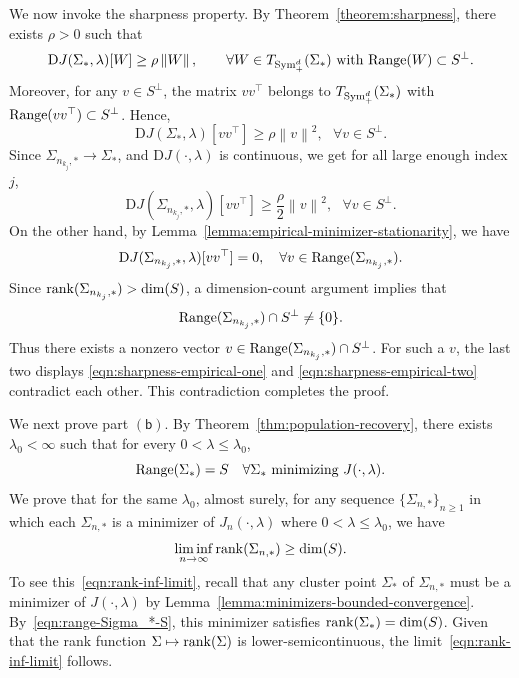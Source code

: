\documentclass[sn-mathphys-num]{sn-jnl}%
\numberwithin{equation}{section}
\newcommand{\norm}[1]{\left\|{#1}\right\|} %
\newcommand{\Range}{{\rm Range}}
\newcommand{\rank}{{\rm rank}}
\newcommand{\Sym}{{\rm \mathrm{Sym}}}
\theoremstyle{thmstyleone}%
\theoremstyle{thmstyletwo}%
\theoremstyle{thmstylethree}%
\begin{document}
We now invoke the sharpness property. By Theorem~\ref{theorem:sharpness}, 
there exists $\rho > 0$ such that
\begin{equation*}
	\mathrm{D} J(\Sigma_*, \lambda)[W] \ge \rho \norm{W}, \qquad \forall W \in T_{\Sym_+^d}(\Sigma_*)~\text{with}~ \Range(W) \subset S^\perp.
\end{equation*}
Moreover, for any $v \in S^\perp$, the matrix $vv^\top$ belongs to
$T_{\Sym_+^d}(\Sigma_*)$ with $\Range(vv^\top) \subset S^\perp$. Hence,
\begin{equation*}
	\mathrm{D} J(\Sigma_*, \lambda)[vv^\top] \ge \rho \norm{v}^2,~~~\forall v\in S^\perp.
\end{equation*} 
Since $\Sigma_{n_{k_j}, *} \to \Sigma_*$, and $\mathrm{D} J(\cdot, \lambda)$ is continuous, we get for all large enough index $j$, 
\begin{equation}
\label{eqn:sharpness-empirical-one}
	\mathrm{D} J(\Sigma_{n_{k_j}, *}, \lambda)[vv^\top] \ge \frac{\rho}{2} \norm{v}^2,~~~\forall v\in S^\perp.
\end{equation}
On the other hand, by Lemma~\ref{lemma:empirical-minimizer-stationarity}, we have 
\begin{equation}
\label{eqn:sharpness-empirical-two}
	\mathrm{D} J(\Sigma_{n_{k_j}, *}, \lambda)[vv^\top] = 0,~~~\forall v\in \Range(\Sigma_{n_{k_j}, *}).
\end{equation} 
Since $\rank(\Sigma_{n_{k_j},*}) > \dim(S)$, a dimension-count argument implies that
\[
\Range(\Sigma_{n_{k_j},*}) \cap S^\perp \neq \{0\}.
\]
Thus there exists a nonzero vector $v \in \Range(\Sigma_{n_{k_j},*}) \cap S^\perp$. For such a $v$, the last two displays
\eqref{eqn:sharpness-empirical-one} and \eqref{eqn:sharpness-empirical-two} contradict each other. This contradiction completes the proof.


We next prove part $\mathsf{(b)}$. By Theorem~\ref{thm:population-recovery}, 
there exists $\lambda_0 < \infty$ such that for every $0 < \lambda \le \lambda_0$, 
\begin{equation}
\label{eqn:range-Sigma_*-S}
	\Range(\Sigma_*) = S~~~\forall \Sigma_*~\text{minimizing}~J(\cdot, \lambda).
\end{equation}
We prove that for the same $\lambda_0$, almost surely, for any sequence 
$\{\Sigma_{n,*}\}_{n\ge 1}$ in which each $\Sigma_{n,*}$ is a minimizer of $J_n(\cdot,\lambda)$ where $0 < \lambda \le \lambda_0$, we have
\begin{equation}
\label{eqn:rank-inf-limit}
	\liminf_{n \to \infty} \rank(\Sigma_{n,*}) \ge \dim(S).
\end{equation}
To see this~\eqref{eqn:rank-inf-limit}, recall that any cluster point $\Sigma_*$ of $\Sigma_{n,*}$ must 
be a minimizer of $J(\cdot,\lambda)$ by Lemma~\ref{lemma:minimizers-bounded-convergence}. 
By~\eqref{eqn:range-Sigma_*-S}, this minimizer satisfies $\rank(\Sigma_*) = \dim(S)$. Given that the rank 
function $\Sigma \mapsto \rank(\Sigma)$ is lower-semicontinuous, the limit~\eqref{eqn:rank-inf-limit} follows. 
\end{document}
